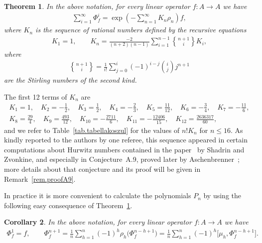 \documentclass[pdftex]{sigma}
\newcommand{\stirl}[2]{\genfrac{\{}{\}}{0pt}{}{#1}{#2}}
\numberwithin{equation}{section}
\newtheorem{Theorem}{Theorem}[section]
\newtheorem{Corollary}[Theorem]{Corollary}
\begin{document}
\begin{Theorem}\label{thm.gaugetriviality}
In the above notation, for every linear operator $f\colon A\to A$ we have
\begin{gather*} \sum_{i=1}^{\infty}\Phi_f^i=\exp\left(-\sum_{n=1}^{\infty}K_n\rho_n\right)f, \end{gather*}
where $K_n$ is the sequence of rational numbers defined by the recursive equations
\begin{gather*} K_1=1,\qquad K_n=\frac{-2}{(n+2)(n-1)}\sum_{i=1}^{n-1} \stirl{n+1}{i}K_i ,\end{gather*}
where
\begin{gather*}\stirl{n+1}{i}=\frac{1}{ i! }\sum_{j=0}^i (-1)^{i-j}\binom{i}{j}j^{n+1}\end{gather*}
are the Stirling numbers of the second kind.
\end{Theorem}

The f\/irst 12 terms of $K_n$ are
\begin{gather*}K_1=1,\quad K_2=-\frac{1}{2},\quad K_3=\frac{1}{2},\quad K_4=-\frac{2}{3},\quad
K_5=\frac{11}{12},\quad K_6=-\frac{3}{4},\quad K_7=-\frac{11}{6}, \\
K_8=\frac{29}{4},\quad K_9=\frac{493}{12},\quad K_{10}=-\frac{2711}{6},
\quad K_{11}=-\frac{12406}{15},\quad K_{12}=\frac{2636317}{60},\end{gather*}
and we refer to Table~\ref{tab.tabellakoszul} for the values of $n! K_n$ for $n\le 16$. As kindly reported to the authors by one referee, this sequence appeared in certain computations about Hurwitz numbers contained in the paper~\cite{SZ} by Shadrin and Zvonkine, and especially in Conjecture~A.9, proved later by Aschenbrenner~\cite{Asche}; more details about that conjecture and its proof will be given in Remark~\ref{rem.proofA9}.

In practice it is more convenient to calculate the polynomials $P_n$ by using the following easy consequence of Theorem~\ref{thm.gaugetriviality}.

\begin{Corollary}\label{cor.recursive}
In the above notation, for every linear operator $f\colon A\to A$ we have
\begin{gather*} \Phi^1_f=f,\qquad \Phi^{n+1}_f=\frac{1}{n}\sum_{h=1}^n(-1)^{h}\rho_h\big(\Phi^{n-h+1}_f\big)=\frac{1}{n}\sum_{h=1}^n(-1)^{h}\big[\mu_h,\Phi^{n-h+1}_f\big].\end{gather*}
\end{Corollary}
\end{document}
